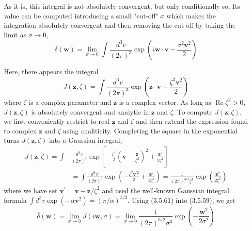 \documentclass{article}
\begin{document}
As it is, this integral is not absolutely convergent, but only conditionally so. Its value can be computed introducing a small "cut-off" $\sigma$ which makes the integration absolutely convergent and then removing the cut-off by taking the limit as $\sigma \rightarrow 0$,
$$
\begin{equation*}
\bar{\delta}(\boldsymbol{w})=\lim _{\sigma \rightarrow 0} \int \frac{d^{3} v}{(2 \pi)^{3}} \exp \left(i \boldsymbol{w} \cdot \boldsymbol{v}-\frac{\sigma^{2} \boldsymbol{v}^{2}}{2}\right) \tag{3.5.59}
\end{equation*}
$$

Here, there appears the integral
$$
\begin{equation*}
J(\boldsymbol{z}, \zeta)=\int \frac{d^{3} v}{(2 \pi)^{3}} \exp \left(\boldsymbol{z} \cdot \boldsymbol{v}-\frac{\zeta^{2} \boldsymbol{v}^{2}}{2}\right) \tag{3.5.60}
\end{equation*}
$$
where $\zeta$ is a complex parameter and $\boldsymbol{z}$ is a complex vector. As long as $\operatorname{Re} \zeta^{2}>0$, $J(\boldsymbol{z}, \zeta)$ is absolutely convergent and analytic in $\boldsymbol{z}$ and $\zeta$. To compute $J(\boldsymbol{z}, \zeta)$, we first conveniently restrict to real $\boldsymbol{z}$ and $\zeta$ and then extend the expression found to complex $\boldsymbol{z}$ and $\zeta$ using analiticity. Completing the square in the exponential turns $J(\boldsymbol{z}, \zeta)$ into
a Gaussian integral,
$$
\begin{align*}
J(\boldsymbol{z}, \zeta)=\int & \frac{d^{3} v}{(2 \pi)^{3}} \exp \left[-\frac{\zeta^{2}}{2}\left(\boldsymbol{v}-\frac{\boldsymbol{z}}{\zeta^{2}}\right)^{2}+\frac{\boldsymbol{z}^{2}}{2 \zeta^{2}}\right]  \tag{3.5.61}\\
& =\int \frac{d^{3} v^{\prime}}{(2 \pi)^{3}} \exp \left(-\frac{\zeta^{2} \boldsymbol{v}^{\prime 2}}{2}+\frac{\boldsymbol{z}^{2}}{2 \zeta^{2}}\right)=\frac{1}{(2 \pi)^{3 / 2} \zeta^{3}} \exp \left(\frac{\boldsymbol{z}^{2}}{2 \zeta^{2}}\right)
\end{align*}
$$
where we have set $\boldsymbol{v}^{\prime}=\boldsymbol{v}-\boldsymbol{z} / \zeta^{2}$ and used the well-known Gaussian integral formula $\int d^{3} v \exp \left(-\alpha \boldsymbol{v}^{2}\right)=(\pi / \alpha)^{3 / 2}$. Using (3.5.61) into (3.5.59), we get
$$
\begin{equation*}
\bar{\delta}(\boldsymbol{w})=\lim _{\sigma \rightarrow 0} J(i \boldsymbol{w}, \sigma)=\lim _{\sigma \rightarrow 0} \frac{1}{(2 \pi)^{3 / 2} \sigma^{3}} \exp \left(-\frac{\boldsymbol{w}^{2}}{2 \sigma^{2}}\right) \tag{3.5.62}
\end{equation*}
$$
\end{document}
